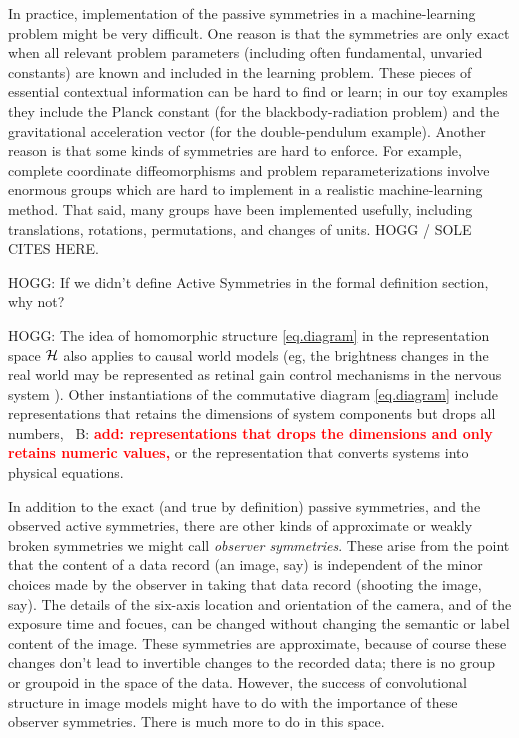 \documentclass{article}
\theoremstyle{plain}
\theoremstyle{definition}
\theoremstyle{remark}
\newcommand{\bernhard}[1]{~B: \textcolor{red}{\textbf{#1}}}
\begin{document}
In practice, implementation of the passive symmetries in a machine-learning problem might be very difficult.
One reason is that the symmetries are only exact when all relevant problem parameters (including often fundamental, unvaried constants) are known and included in the learning problem.
These pieces of essential contextual information can be hard to find or learn; in our toy examples they include the Planck constant (for the blackbody-radiation problem) and the gravitational acceleration vector (for the double-pendulum example).
Another reason is that some kinds of symmetries are hard to enforce.
For example, complete coordinate diffeomorphisms and problem reparameterizations involve enormous groups which are hard to implement in a realistic machine-learning method.
That said, many groups have been implemented usefully, including translations, rotations, permutations, and changes of units. HOGG / SOLE CITES HERE.


HOGG: If we didn't define Active Symmetries in the formal definition section, why not?

HOGG: The idea of homomorphic structure \eqref{eq.diagram} in the representation space $\cal H$ also applies to causal world models (eg, the brightness changes in the real world may be represented as retinal gain control mechanisms in the nervous system \cite{1911.10500}).
 Other instantiations of the commutative diagram \eqref{eq.diagram} include representations that retains the dimensions of system components but drops all numbers, \bernhard{add: representations that drops the dimensions and only retains numeric values,} or the representation that converts systems into physical equations.

In addition to the exact (and true by definition) passive symmetries, and the observed active symmetries, there are other kinds of approximate or weakly broken symmetries we might call \emph{observer symmetries}.
These arise from the point that the content of a data record (an image, say) is independent of the minor choices made by the observer in taking that data record (shooting the image, say).
The details of the six-axis location and orientation of the camera, and of the exposure time and focues, can be changed without changing the semantic or label content of the image.
These symmetries are approximate, because of course these changes don't lead to invertible changes to the recorded data; there is no group or groupoid in the space of the data.
However, the success of convolutional structure in image models might have to do with the importance of these observer symmetries.
There is much more to do in this space.

{\raggedright


}
\end{document}
